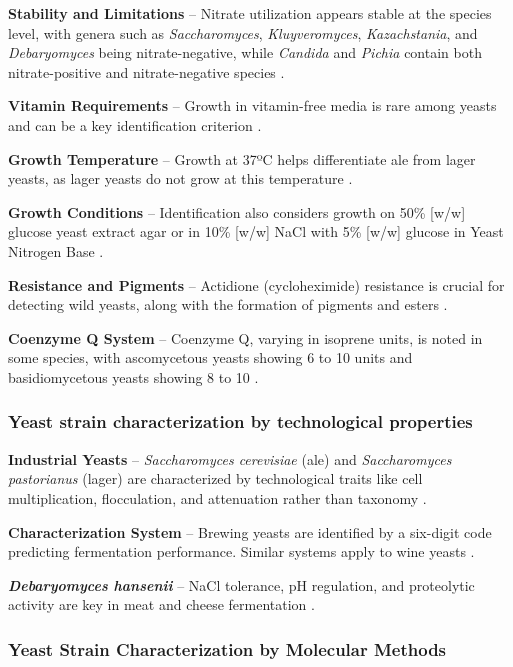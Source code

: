 \textbf{Stability and Limitations} – Nitrate utilization appears stable at the species level, with genera such as \textit{Saccharomyces}, \textit{Kluyveromyces}, \textit{Kazachstania}, and \textit{Debaryomyces} being nitrate-negative, while \textit{Candida} and \textit{Pichia} contain both nitrate-positive and nitrate-negative species \cite*{L2-YeastClass}.



\textbf{Vitamin Requirements} – Growth in vitamin-free media is rare among yeasts and can be a key identification criterion \cite*{L2-YeastClass}.

\textbf{Growth Temperature} – Growth at 37ºC helps differentiate ale from lager yeasts, as lager yeasts do not grow at this temperature \cite*{L2-YeastClass}.

\textbf{Growth Conditions} – Identification also considers growth on 50\% [w/w] glucose yeast extract agar or in 10\% [w/w] NaCl with 5\% [w/w] glucose in Yeast Nitrogen Base \cite*{L2-YeastClass}.

\textbf{Resistance and Pigments} – Actidione (cycloheximide) resistance is crucial for detecting wild yeasts, along with the formation of pigments and esters \cite*{L2-YeastClass}.

\textbf{Coenzyme Q System} – Coenzyme Q, varying in isoprene units, is noted in some species, with ascomycetous yeasts showing 6 to 10 units and basidiomycetous yeasts showing 8 to 10 \cite*{L2-YeastClass}.

\subsubsection{Yeast strain characterization by technological properties}

\textbf{Industrial Yeasts} – \textit{Saccharomyces cerevisiae} (ale) and \textit{Saccharomyces pastorianus} (lager) are characterized by technological traits like cell multiplication, flocculation, and attenuation rather than taxonomy \cite*{L2-YeastClass}.

\textbf{Characterization System} – Brewing yeasts are identified by a six-digit code predicting fermentation performance. Similar systems apply to wine yeasts \cite*{L2-YeastClass}.

\textbf{\textit{Debaryomyces hansenii}} – NaCl tolerance, pH regulation, and proteolytic activity are key in meat and cheese fermentation \cite*{L2-YeastClass}.

\subsubsection*{Yeast Strain Characterization by Molecular Methods}

